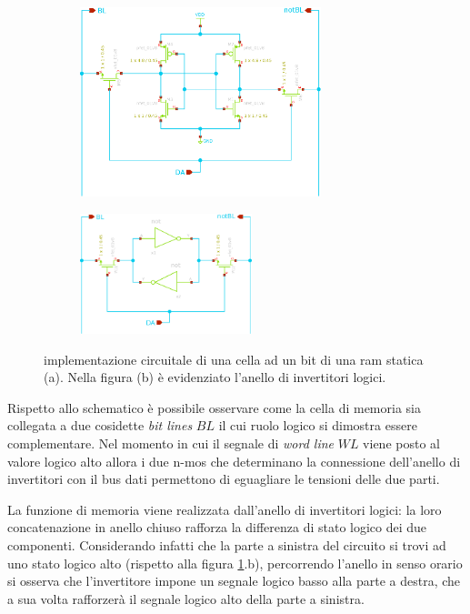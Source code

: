 	\begin{figure}[bht]
		\centering
		\begin{subfigure}{0.48\linewidth}
			\centering
			\includegraphics[width=7cm]{Immagini/sram-1bit}
			\caption{}
		\end{subfigure}
		\begin{subfigure}{0.48\linewidth}
			\centering
			\includegraphics[width=5cm]{Immagini/sram-1bit-simple}
			\caption{}
		\end{subfigure}
		\caption{implementazione circuitale di una cella ad un bit di una ram statica (a). Nella figura (b) è evidenziato l'anello di invertitori logici.}
		\label{fig:sram:sch}
	\end{figure}

	Rispetto allo schematico è possibile osservare come la cella di memoria sia collegata a due cosidette \textit{bit lines} $BL$ il cui ruolo logico si dimostra essere complementare. Nel momento in cui il segnale di \textit{word line} $WL$ viene posto al valore logico alto allora i due n-mos che determinano la connessione dell'anello di invertitori con il bus dati permettono di eguagliare le tensioni delle due parti.
	
	La funzione di memoria viene realizzata dall'anello di invertitori logici: la loro concatenazione in anello chiuso rafforza la differenza di stato logico dei due componenti. Considerando infatti che la parte a sinistra del circuito si trovi ad uno stato logico alto (rispetto alla figura \ref{fig:sram:sch}.b), percorrendo l'anello in senso orario si osserva che l'invertitore impone un segnale logico basso alla parte a destra, che a sua volta rafforzerà il segnale logico alto della parte a sinistra.
	
